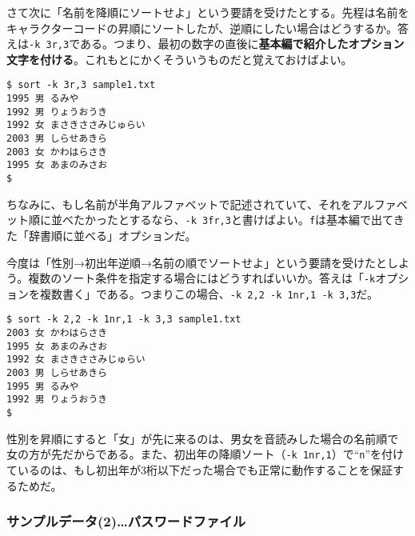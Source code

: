 さて次に「名前を降順にソートせよ」という要請を受けたとする。先程は名前をキャラクターコードの昇順にソートしたが、逆順にしたい場合はどうするか。答えは\verb|-k 3r,3|である。つまり、最初の数字の直後に\textbf{基本編で紹介したオプション文字を付ける}。これもとにかくそういうものだと覚えておけばよい。
\begin{screen}
	\verb!$ sort -k 3r,3 sample1.txt! \return \\
	\verb!1995 男 るみや! \\
	\verb!1992 男 りょうおうき! \\
	\verb!1992 女 まさきささみじゅらい! \\
	\verb!2003 男 しらせあきら! \\
	\verb!2003 女 かわはらさき! \\
	\verb!1995 女 あまのみさお! \\
	\verb!$ !
\end{screen}

ちなみに、もし名前が半角アルファベットで記述されていて、それをアルファベット順に並べたかったとするなら、\verb|-k 3fr,3|と書けばよい。\verb|f|は基本編で出てきた「辞書順に並べる」オプションだ。

今度は「性別→初出年逆順→名前の順でソートせよ」という要請を受けたとしよう。複数のソート条件を指定する場合にはどうすればいいか。答えは「\verb|-k|オプションを複数書く」である。つまりこの場合、\verb|-k 2,2 -k 1nr,1 -k 3,3|だ。
\begin{screen}
	\verb!$ sort -k 2,2 -k 1nr,1 -k 3,3 sample1.txt! \return \\
	\verb!2003 女 かわはらさき! \\
	\verb!1995 女 あまのみさお! \\
	\verb!1992 女 まさきささみじゅらい! \\
	\verb!2003 男 しらせあきら! \\
	\verb!1995 男 るみや! \\
	\verb!1992 男 りょうおうき! \\
	\verb!$ !
\end{screen}

性別を昇順にすると「女」が先に来るのは、男女を音読みした場合の名前順で女の方が先だからである。また、初出年の降順ソート（\verb|-k 1nr,1|）で``\verb|n|''を付けているのは、もし初出年が3桁以下だった場合でも正常に動作することを保証するためだ。

\subsubsection*{サンプルデータ(2)…パスワードファイル}

